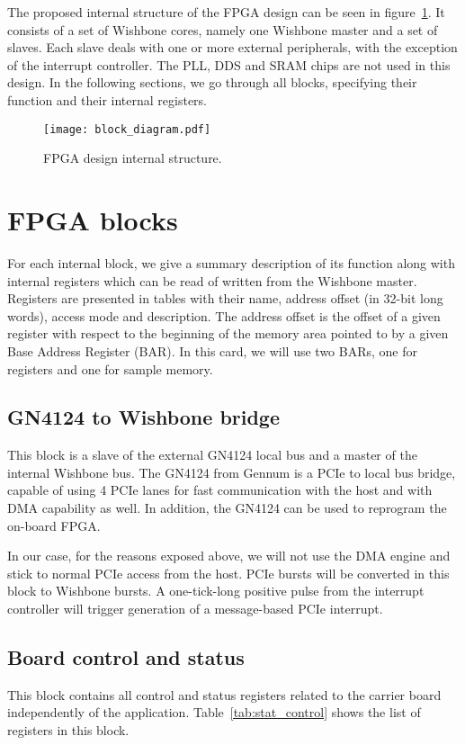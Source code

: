 \documentclass{article}
\begin{document}
The proposed internal structure of the FPGA design can be seen in figure~\ref{fig:block_diagram}. It consists of a set of Wishbone cores, namely one Wishbone master and a set of slaves. Each slave deals with one or more external peripherals, with the exception of the interrupt controller. The PLL, DDS and SRAM chips are not used in this design. In the following sections, we go through all blocks, specifying their function and their internal registers.

\begin{figure}[htbp]
  \centering
  \texttt{[image: block\_diagram.pdf]}
  \caption{FPGA design internal structure.}
  \label{fig:block_diagram}
\end{figure}

\section{FPGA blocks}
For each internal block, we give a summary description of its function along with internal registers which can be read of written from the Wishbone master. Registers are presented in tables with their name, address offset (in 32-bit long words), access mode and description. The address offset is the offset of a given register with respect to the beginning of the memory area pointed to by a given Base Address Register (BAR). In this card, we will use two BARs, one for registers and one for sample memory.

\subsection{GN4124 to Wishbone bridge}
This block is a slave of the external GN4124 local bus and a master of the internal Wishbone bus. The GN4124 from Gennum is a PCIe to local bus bridge, capable of using 4 PCIe lanes for fast communication with the host and with DMA capability as well. In addition, the GN4124 can be used to reprogram the on-board FPGA. 

In our case, for the reasons exposed above, we will not use the DMA engine and stick to normal PCIe access from the host. PCIe bursts will be converted in this block to Wishbone bursts. A one-tick-long positive pulse from the interrupt controller will trigger generation of a message-based PCIe interrupt.

\subsection{Board control and status}
This block contains all control and status registers related to the carrier board independently of the application. Table~\ref{tab:stat_control} shows the list of registers in this block.
\end{document}
